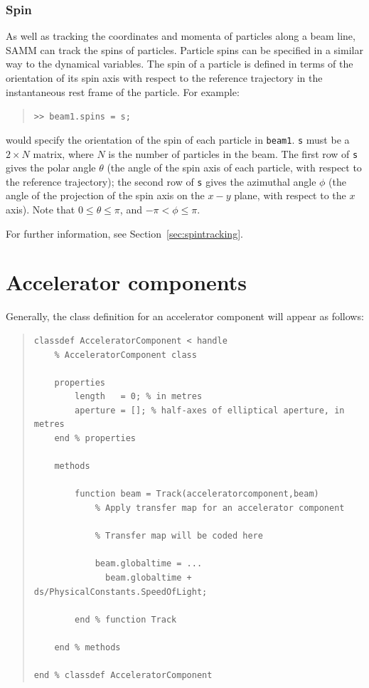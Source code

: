 \documentclass[11pt,twoside,a4paper]{article}
\begin{document}
\subsubsection{Spin\label{subsec:spin}}
As well as tracking the coordinates and momenta of particles along a beam
line, SAMM can track the spins of particles.
Particle spins can be specified in a similar way to the dynamical variables.
The spin of a particle is defined in terms of the orientation of its spin axis with
respect to the reference trajectory in the instantaneous rest frame of the
particle.  For example:
\begin{quote}
\texttt{>> beam1.spins = s;}
\end{quote}
would specify the orientation of the spin of each particle in \texttt{beam1}.
\texttt{s} must be a $2\times N$ matrix, where $N$ is the number of particles
in the beam.  The first row of \texttt{s} gives the polar angle $\theta$ (the
angle of the spin axis of each particle, with respect to the reference trajectory);
the second row of \texttt{s} gives the azimuthal angle $\phi$ (the angle of the
projection of the spin axis on the $x-y$ plane, with respect to the $x$ axis).
Note that $0 \leq \theta \leq \pi$, and $-\pi < \phi \leq \pi$.

For further information, see Section~\ref{sec:spintracking}.


\section{Accelerator components}
Generally, the class definition for an accelerator component will appear
as follows:
\begin{quote}
\begin{verbatim}
classdef AcceleratorComponent < handle
    % AcceleratorComponent class
    
    properties
        length   = 0; % in metres
        aperture = []; % half-axes of elliptical aperture, in metres
    end % properties
    
    methods
    
        function beam = Track(acceleratorcomponent,beam)
            % Apply transfer map for an accelerator component
            
            % Transfer map will be coded here
            
            beam.globaltime = ...
              beam.globaltime + ds/PhysicalConstants.SpeedOfLight;
              
        end % function Track
        
    end % methods
    
end % classdef AcceleratorComponent
\end{verbatim}
\end{quote}
\end{document}

